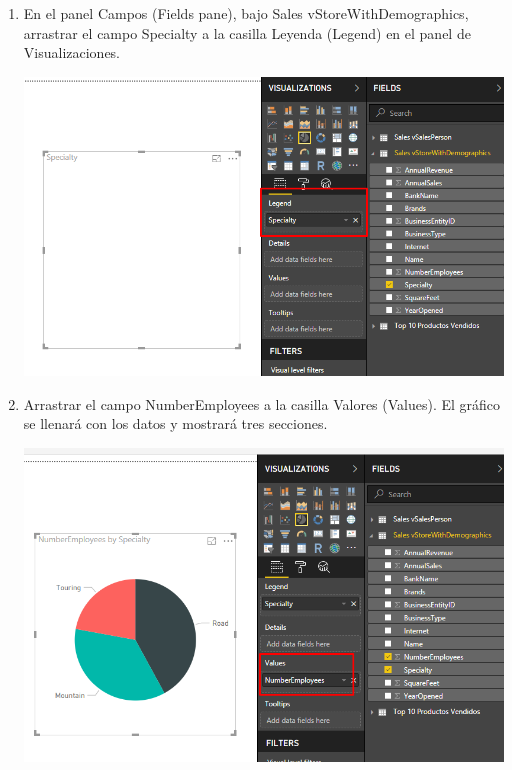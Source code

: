 \begin{itemize}
\begin{enumerate}
\item  En el panel Campos (Fields pane), bajo Sales vStoreWithDemographics, arrastrar el campo Specialty a la casilla Leyenda (Legend) en el panel de Visualizaciones.
\begin{center}
\includegraphics[scale=0.55]{./Imagenes/9.png}
\end{center}

\item Arrastrar el campo NumberEmployees a la casilla Valores (Values). El gráfico se llenará con los datos y mostrará tres secciones.
\begin{center}
\includegraphics[scale=0.55]{./Imagenes/10.png}
\end{center}


\end{enumerate}
\end{itemize}
